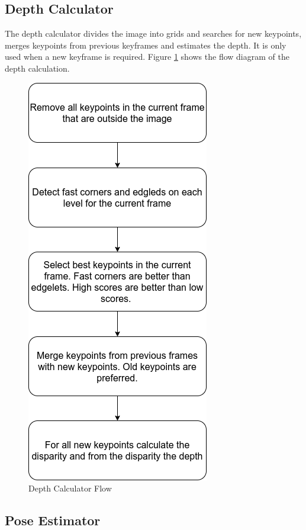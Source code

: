 \documentclass[11pt,a4paper,titlepage,oneside]{report}
\begin{document}
\subsection{Depth Calculator}

The depth calculator divides the image into grids and searches for new keypoints, merges keypoints from previous keyframes and estimates the depth. It is only used when a new keyframe is required. Figure \ref{fig:flow_depth_calculator} shows the flow diagram of the depth calculation.

\begin{figure}[H]
  \centering
  \includegraphics[scale=0.3]{img/flow_depth_calculator.png}
  \caption{Depth Calculator Flow}\label{fig:flow_depth_calculator}
\end{figure}

\subsection{Pose Estimator}
\end{document}
